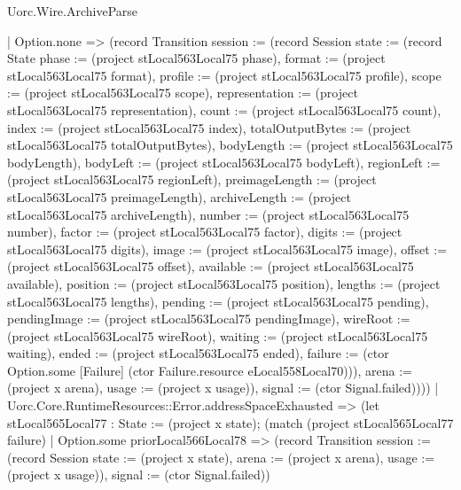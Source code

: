 \begin{lexlean}{Uorc.Wire.ArchiveParse}
\begin{semanticmodule}
{        | Option.none => (record Transition {session := (record Session {state := (record State {phase := (project stLocal563Local75 phase), format := (project stLocal563Local75 format), profile := (project stLocal563Local75 profile), scope := (project stLocal563Local75 scope), representation := (project stLocal563Local75 representation), count := (project stLocal563Local75 count), index := (project stLocal563Local75 index), totalOutputBytes := (project stLocal563Local75 totalOutputBytes), bodyLength := (project stLocal563Local75 bodyLength), bodyLeft := (project stLocal563Local75 bodyLeft), regionLeft := (project stLocal563Local75 regionLeft), preimageLength := (project stLocal563Local75 preimageLength), archiveLength := (project stLocal563Local75 archiveLength), number := (project stLocal563Local75 number), factor := (project stLocal563Local75 factor), digits := (project stLocal563Local75 digits), image := (project stLocal563Local75 image), offset := (project stLocal563Local75 offset), available := (project stLocal563Local75 available), position := (project stLocal563Local75 position), lengths := (project stLocal563Local75 lengths), pending := (project stLocal563Local75 pending), pendingImage := (project stLocal563Local75 pendingImage), wireRoot := (project stLocal563Local75 wireRoot), waiting := (project stLocal563Local75 waiting), ended := (project stLocal563Local75 ended), failure := (ctor Option.some [Failure] (ctor Failure.resource eLocal558Local70))}), arena := (project x arena), usage := (project x usage)}), signal := (ctor Signal.failed)})))
      | Uorc.Core.RuntimeResources::Error.addressSpaceExhausted => (let stLocal565Local77 : State := (project x state); (match (project stLocal565Local77 failure)
        | Option.some priorLocal566Local78 => (record Transition {session := (record Session {state := (project x state), arena := (project x arena), usage := (project x usage)}), signal := (ctor Signal.failed)})
}
\end{semanticmodule}
\end{lexlean}
